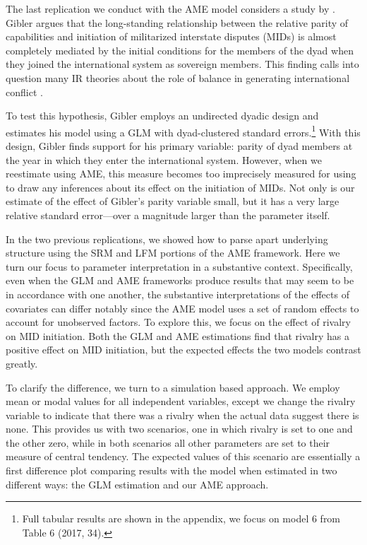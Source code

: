 The last replication we conduct with the AME model considers a study by \citet{gibler:2017}. Gibler argues that the long-standing relationship between the relative parity of capabilities and initiation of militarized interstate disputes (MIDs) is almost completely mediated by the initial conditions for the members of the dyad when they joined the international system as sovereign members. This finding calls into question many IR theories about the role of balance in generating international conflict \citep{organski:1958}.

To test this hypothesis, Gibler employs an undirected dyadic design and estimates his model using a GLM with dyad-clustered standard errors.\footnote{Full tabular results are shown in the appendix, we focus on model 6 from Table 6 (2017, 34).} With this design, Gibler finds support for his primary variable: parity of dyad members at the year in which they enter the international system. However, when we reestimate using AME, this measure becomes too imprecisely measured for using to draw any inferences about its effect on the initiation of MIDs. Not only is our estimate of the effect of Gibler's parity variable small, but it has a very large relative standard error---over a magnitude larger than the parameter itself. 

In the two previous replications, we showed how to parse apart underlying structure using the SRM and LFM portions of the AME framework. Here we turn our focus to parameter interpretation in a substantive context. Specifically, even when the GLM and AME frameworks produce results that may seem to be in accordance with one another, the substantive interpretations of the effects of covariates can differ notably since the AME model uses a set of random effects to account for unobserved factors. To explore this, we focus on the effect of rivalry on  MID initiation. Both the GLM and AME estimations find that rivalry has a positive effect on MID initiation, but the expected effects the two models contrast greatly.

To clarify the difference, we turn to a simulation based approach. We employ mean or modal values for all independent variables, except we change the rivalry variable to indicate that there was a rivalry when the actual data suggest there is none. This provides us with two scenarios, one in which rivalry is set to one and the other zero, while in both scenarios all other parameters are set to their measure of central tendency. The expected values of this scenario are essentially a first difference plot comparing results with the model when estimated in two different ways: the GLM estimation and our AME approach.  

